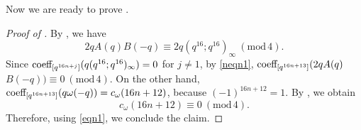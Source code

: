 \documentclass[12pt,reqno]{amsart}
\renewcommand{\(}{\left\(}
\renewcommand{\)}{\right\)}
\newcommand{\os}[2]{\overset{#1}{#2}}
\numberwithin{equation}{section}
\theoremstyle{plain}
\theoremstyle{definition}
\numberwithin{equation}{section}
\renewcommand{\pmod}[1]{\ \left( \mathrm{mod} \, #1 \right)}
\begin{document}
Now we are ready to prove .

\begin{proof}[Proof of ]
By , we have
\begin{equation}\label{neqn1}
2qA(q)B(-q)\equiv 2q\left(q^{16};q^{16}\right)_\infty \pmod 4.
\end{equation}
 Since $\textnormal{coeff}_{[q^{16n+j}]}(q(q^{16};q^{16})_\infty)=0$ for $j\neq 1$, by \eqref{neqn1},
$\textnormal{coeff}_{[q^{16n+13}]}(2qA(q)$\ $B(-q))\equiv 0\pmod{4}$. On the other hand, 
$\textnormal{coeff}_{[q^{16n+13}]}(q\omega(-q))=c_{\omega}(16n+12)$, because $(-1)^{16n+12}=1$.
By , we obtain
\[
c_{\omega}(16n+12)\equiv 0 \pmod 4.
\]
Therefore, using \eqref{eqn1}, we conclude the claim.\qedhere
\end{proof}



\end{document}
